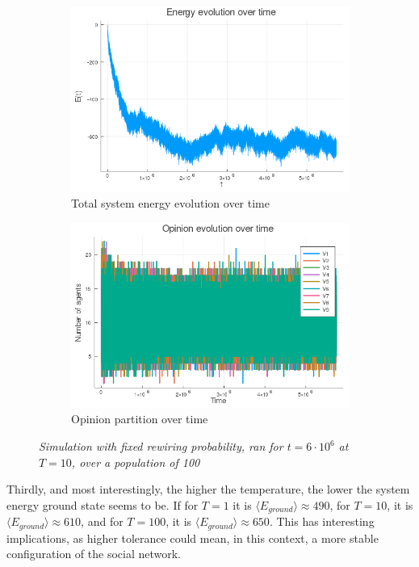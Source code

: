 \documentclass[12pt,openright,twoside]{book}
\begin{document}
\begin{figure}[!htb]
\centering
\begin{subfigure}{0.47\linewidth}
    \includegraphics[width=\linewidth]{figures/2_2_t10/energy_evolution.png}
    \caption{Total system energy evolution over time}
\end{subfigure}
\begin{subfigure}{0.47\linewidth}
    \includegraphics[width=\linewidth]{figures/2_2_t10/vote_evolution.png}
    \caption{Opinion partition over time}
\end{subfigure}
\caption{\textit{{\small Simulation with fixed rewiring probability, ran for $t=6\cdot 10^6$ at $T=10$, over a population of 100}}}
\label{2_2_t10:ener_inne}
\end{figure}


Thirdly, and most interestingly, the higher the temperature, the lower the system energy ground state seems to be. If for $T=1$ it is $\langle E_{ground} \rangle\approx490$, for $T=10$, it is $\langle E_{ground} \rangle\approx610$, and for $T=100$, it is $\langle E_{ground} \rangle\approx650$. This has interesting implications, as higher tolerance could mean, in this context, a more stable configuration of the social network.\\
\end{document}
